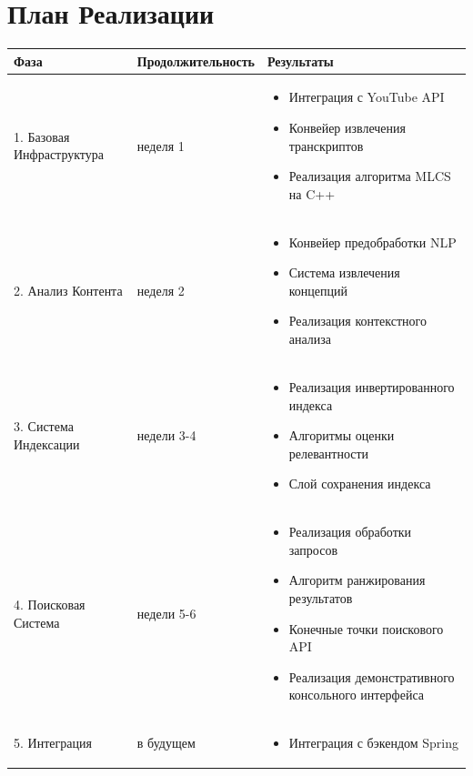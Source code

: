 \documentclass[12pt,a4paper]{article}
\begin{document}
\section{План Реализации}

\begin{table}[H]
\centering
\begin{tabular}{@{}llp{7cm}@{}}
\toprule
\textbf{Фаза} & \textbf{Продолжительность} & \textbf{Результаты} \\
\midrule
1. Базовая Инфраструктура & неделя 1 &
  \begin{itemize}[leftmargin=*, nosep]
    \item Интеграция с YouTube API
    \item Конвейер извлечения транскриптов
    \item Реализация алгоритма MLCS на C++
  \end{itemize} \\
\midrule
2. Анализ Контента & неделя 2 &
  \begin{itemize}[leftmargin=*, nosep]
    \item Конвейер предобработки NLP
    \item Система извлечения концепций
    \item Реализация контекстного анализа
  \end{itemize} \\
\midrule
3. Система Индексации & недели 3-4 &
  \begin{itemize}[leftmargin=*, nosep]
    \item Реализация инвертированного индекса
    \item Алгоритмы оценки релевантности
    \item Слой сохранения индекса
  \end{itemize} \\
\midrule
4. Поисковая Система & недели 5-6 &
  \begin{itemize}[leftmargin=*, nosep]
    \item Реализация обработки запросов
    \item Алгоритм ранжирования результатов
    \item Конечные точки поискового API
    \item Реализация демонстративного консольного интерфейса
  \end{itemize} \\
\midrule
5. Интеграция & в будущем &
  \begin{itemize}[leftmargin=*, nosep]
    \item Интеграция с бэкендом Spring

\end{itemize}
\end{tabular}
\end{table}
\end{document}
